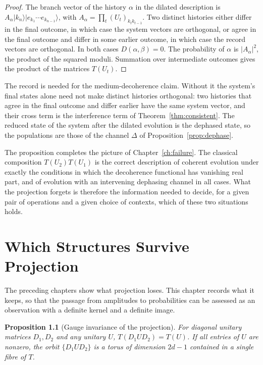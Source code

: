 \documentclass[11pt,oneside]{book}
\newtheorem{proposition}[theorem]{Proposition}
\theoremstyle{definition}
\theoremstyle{remark}
\begin{document}
\begin{proof}
The branch vector of the history $\alpha$ in the dilated description is $A_\alpha|k_n\rangle|e_{k_1}\cdots e_{k_{n-1}}\rangle$, with $A_\alpha=\prod_t(U_t)_{k_tk_{t-1}}$. Two distinct histories either differ in the final outcome, in which case the system vectors are orthogonal, or agree in the final outcome and differ in some earlier outcome, in which case the record vectors are orthogonal. In both cases $D(\alpha,\beta)=0$. The probability of $\alpha$ is $|A_\alpha|^2$, the product of the squared moduli. Summation over intermediate outcomes gives the product of the matrices $T(U_t)$.
\end{proof}

The record is needed for the medium-decoherence claim. Without it the system's final states alone need not make distinct histories orthogonal: two histories that agree in the final outcome and differ earlier have the same system vector, and their cross term is the interference term of Theorem~\ref{thm:consistent}. The reduced state of the system after the dilated evolution is the dephased state, so the populations are those of the channel $\Delta$ of Proposition~\ref{prop:dephase}.

The proposition completes the picture of Chapter~\ref{ch:failure}. The classical composition $T(U_2)T(U_1)$ is the correct description of coherent evolution under exactly the conditions in which the decoherence functional has vanishing real part, and of evolution with an intervening dephasing channel in all cases. What the projection forgets is therefore the information needed to decide, for a given pair of operations and a given choice of contexts, which of these two situations holds.

\chapter{Which Structures Survive Projection}\label{ch:survive}

The preceding chapters show what projection loses. This chapter records what it keeps, so that the passage from amplitudes to probabilities can be assessed as an observation with a definite kernel and a definite image.

\begin{proposition}[Gauge invariance of the projection]\label{prop:gauge}
For diagonal unitary matrices $D_1,D_2$ and any unitary $U$, $T(D_1UD_2)=T(U)$. If all entries of $U$ are nonzero, the orbit $\{D_1UD_2\}$ is a torus of dimension $2d-1$ contained in a single fibre of $T$.
\end{proposition}
\end{document}
